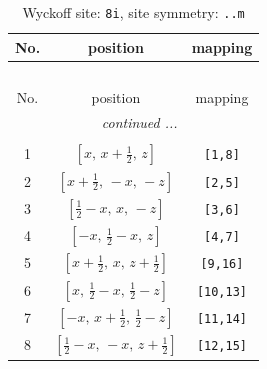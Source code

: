 \documentclass[fleqn,8pt]{jsarticle}
\begin{document}
\begin{longtable}{ccc}
\caption{Wyckoff site: {\tt 8i}, site symmetry: {\tt ..m}}
 \\
 \hline \hline
No. & position & mapping \\ \hline \endfirsthead

\multicolumn{2}{l}{\tablename\ \thetable{}} \\
 \hline \hline
No. & position & mapping \\ \hline \endhead

 \hline \hline
\multicolumn{2}{r}{\footnotesize\it continued ...} \\ \endfoot

 \hline \hline
\multicolumn{2}{r}{} \\ \endlastfoot

1 & $\left[ x,\, x + \frac{1}{2},\, z \right]$ & {\tt [1,8]} \\ \hline
2 & $\left[ x + \frac{1}{2},\, - x,\, - z \right]$ & {\tt [2,5]} \\ \hline
3 & $\left[ \frac{1}{2} - x,\, x,\, - z \right]$ & {\tt [3,6]} \\ \hline
4 & $\left[ - x,\, \frac{1}{2} - x,\, z \right]$ & {\tt [4,7]} \\ \hline
5 & $\left[ x + \frac{1}{2},\, x,\, z + \frac{1}{2} \right]$ & {\tt [9,16]} \\ \hline
6 & $\left[ x,\, \frac{1}{2} - x,\, \frac{1}{2} - z \right]$ & {\tt [10,13]} \\ \hline
7 & $\left[ - x,\, x + \frac{1}{2},\, \frac{1}{2} - z \right]$ & {\tt [11,14]} \\ \hline
8 & $\left[ \frac{1}{2} - x,\, - x,\, z + \frac{1}{2} \right]$ & {\tt [12,15]} \\
\end{longtable}
\renewcommand{\arraystretch}{1.2}
\end{document}
